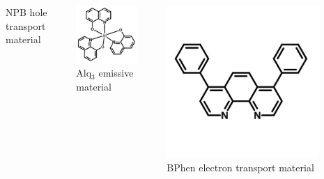 \documentclass{beamer}
\begin{document}
\begin{frame}
\begin{columns}
\begin{column}{0.3\textwidth}
					\tiny NPB hole transport material
				\end{column}
				\begin{column}{0.3\textwidth}
					\centering
					\includegraphics[width=0.8\textwidth]{images/Alq3_structure.png}\\
					\tiny Alq$_3$ emissive material
				\end{column}
				\begin{column}{0.3\textwidth}
					\centering
					\includegraphics[width=0.8\textwidth]{images/bphen_structure.jpg}\\
					\tiny BPhen electron transport material
				\end{column}
			\end{columns}
		\end{frame}
    
\end{document}
